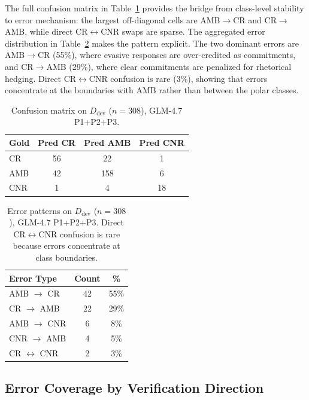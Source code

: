 \documentclass[11pt]{article}
\newcommand{\rev}[1]{#1}
\begin{document}
\rev{The full confusion matrix in Table~\ref{tab:confusion} provides the bridge from class-level stability to error mechanism: the largest off-diagonal cells are AMB$\rightarrow$CR and CR$\rightarrow$AMB, while direct CR$\leftrightarrow$CNR swaps are sparse.} The aggregated error distribution in Table~\ref{tab:errors} makes the pattern explicit. The two dominant errors are AMB$\rightarrow$CR (55\%), where evasive responses are over-credited as commitments, and CR$\rightarrow$AMB (29\%), where clear commitments are penalized for rhetorical hedging. Direct CR$\leftrightarrow$CNR confusion is rare (3\%), showing that errors concentrate at the boundaries with AMB rather than between the polar classes.

\begin{table}[t]
\centering
\small
\setlength{\tabcolsep}{5pt}
\begin{tabular}{lccc}
\toprule
\textbf{Gold} & \textbf{Pred CR} & \textbf{Pred AMB} & \textbf{Pred CNR} \\
\midrule
CR & 56 & 22 & 1 \\
AMB & 42 & 158 & 6 \\
CNR & 1 & 4 & 18 \\
\bottomrule
\end{tabular}
\caption{Confusion matrix on $D_{\text{dev}}$ ($n{=}308$), GLM-4.7 P1+P2+P3.}
\label{tab:confusion}
\end{table}

\begin{table}[t]
\centering
\small
\begin{tabular}{lcc}
\toprule
\textbf{Error Type} & \textbf{Count} & \textbf{\%} \\
\midrule
AMB $\rightarrow$ CR & 42 & 55\% \\
CR $\rightarrow$ AMB & 22 & 29\% \\
AMB $\rightarrow$ CNR & 6 & 8\% \\
CNR $\rightarrow$ AMB & 4 & 5\% \\
CR $\leftrightarrow$ CNR & 2 & 3\% \\
\bottomrule
\end{tabular}
\caption{Error patterns on $D_{\text{dev}}$ ($n{=}308$), GLM-4.7 P1+P2+P3. Direct CR$\leftrightarrow$CNR confusion is rare because errors concentrate at class boundaries.}
\label{tab:errors}
\end{table}

\subsection{Error Coverage by Verification Direction}
\end{document}

